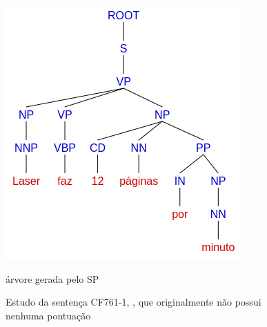 \begin{figure}[!ht]
\begin{minipage}{.45\textwidth}
        \includegraphics[width=\linewidth]{imagens/ec_bosque_sem_ponto_tree_sp.png}
        \caption{árvore gerada pelo SP}
    \end{minipage}
    \caption[Estudo de caso BOSQUE - Sentença transduzida sem pontuação]{Estudo da sentença CF761-1, , que originalmente não possui nenhuma pontuação}
    \label{fig:ec_bosque_sem_ponto_tree}
\end{figure}